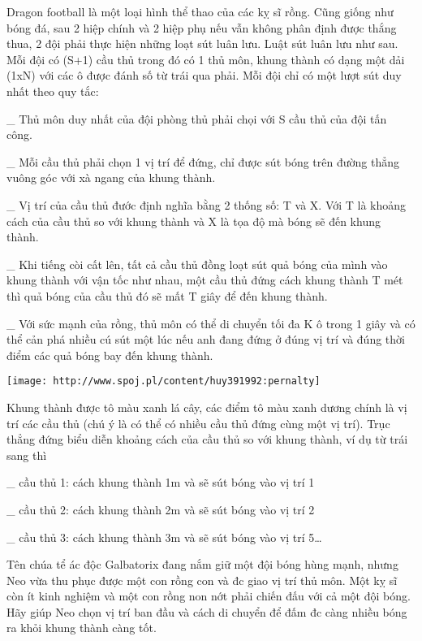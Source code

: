 Dragon football là một loại hình thể thao của các kỵ sĩ rồng. Cũng giống như bóng đá, sau 2 hiệp chính và 2 hiệp phụ nếu vẫn không phân định được thắng thua, 2 đội phải thực hiện những loạt sút luân lưu. Luật sút luân lưu như sau. Mỗi đội có (S+1) cầu thủ trong đó có 1 thủ môn, khung thành có dạng một dải (1xN) với các ô được đánh số từ trái qua phải. Mỗi đội chỉ có một lượt sút duy nhất theo quy tắc:   


   \_ Thủ môn duy nhất của đội phòng thủ phải chọi với S cầu thủ của đội tấn công.   


   \_ Mỗi cầu thủ phải chọn 1 vị trí để đứng, chỉ được sút bóng trên đường thẳng vuông góc với xà ngang của khung thành.   


   \_ Vị trí của cầu thủ đước định nghĩa bằng 2 thống số: T và X. Với T là khoảng cách của cầu thủ so với khung thành và X là tọa độ mà bóng sẽ đến khung thành.   


   \_ Khi tiếng còi cất lên, tất cả cầu thủ đồng loạt sút quả bóng của mình vào khung thành với vận tốc như nhau, một cầu thủ đứng cách khung thành T mét thì quả bóng của cầu thủ đó sẽ mất T giây để đến khung thành.   


   \_ Với sức mạnh của rồng, thủ môn có thể di chuyển tối đa K ô trong 1 giây và có thể cản phá nhiều cú sút một lúc nếu anh đang đứng ở đúng vị trí và đúng thời điểm các quả bóng bay đến khung thành.   



\texttt{[image: http://www.spoj.pl/content/huy391992:pernalty]}


   Khung thành được tô màu xanh lá cây, các điểm tô màu xanh dương chính là vị trí các cầu thủ (chú ý là có thể có nhiều cầu thủ đứng cùng một vị trí). Trục thẳng đứng biểu diễn khoảng cách của cầu thủ so với khung thành, ví dụ từ trái sang thì   


   \_ cầu thủ 1: cách khung thành 1m và sẽ sút bóng vào vị trí 1   


   \_ cầu thủ 2: cách khung thành 2m và sẽ sút bóng vào vị trí 2   


   \_ cầu thủ 3: cách khung thành 3m và sẽ sút bóng vào vị trí 5…   


   Tên chúa tể ác độc Galbatorix đang nắm giữ một đội bóng hùng mạnh, nhưng Neo vừa thu phục được một con rồng con và đc giao vị trí thủ môn. Một kỵ sĩ còn ít kinh nghiệm và một con rồng non nớt phải chiến đấu với cả một đội bóng. Hãy giúp Neo chọn vị trí ban đầu và cách di chuyển để đấm đc càng nhiều bóng ra khỏi khung thành càng tốt.